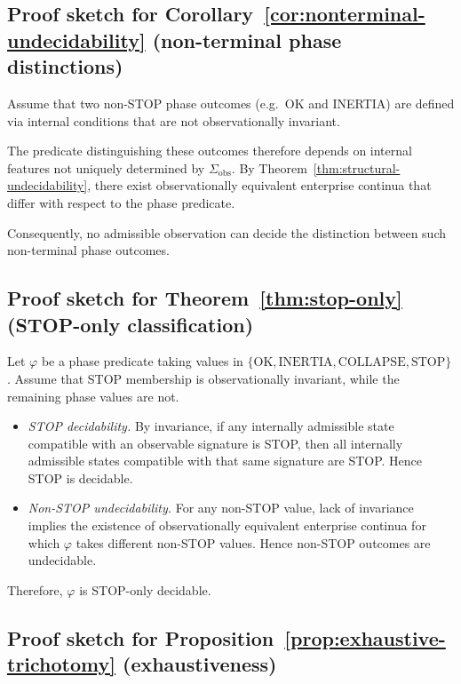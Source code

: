 \subsection{Proof sketch for Corollary~\ref{cor:nonterminal-undecidability}
(non-terminal phase distinctions)}

Assume that two non-STOP phase outcomes (e.g.\ OK and INERTIA) are
defined via internal conditions that are not observationally invariant.

The predicate distinguishing these outcomes therefore depends on
internal features not uniquely determined by
$\Sigma_{\mathrm{obs}}$. By
Theorem~\ref{thm:structural-undecidability}, there exist
observationally equivalent enterprise continua that differ with respect
to the phase predicate.

Consequently, no admissible observation can decide the distinction
between such non-terminal phase outcomes.

\subsection{Proof sketch for Theorem~\ref{thm:stop-only}
(STOP-only classification)}

Let $\varphi$ be a phase predicate taking values in
$\{\text{OK}, \text{INERTIA}, \text{COLLAPSE}, \text{STOP}\}$.
Assume that STOP membership is observationally invariant, while the
remaining phase values are not.

\begin{itemize}
\item \emph{STOP decidability.} By invariance, if any internally
      admissible state compatible with an observable signature is STOP,
      then all internally admissible states compatible with that same
      signature are STOP. Hence STOP is decidable.
\item \emph{Non-STOP undecidability.} For any non-STOP value, lack of
      invariance implies the existence of observationally equivalent
      enterprise continua for which $\varphi$ takes different non-STOP
      values. Hence non-STOP outcomes are undecidable.
\end{itemize}

Therefore, $\varphi$ is STOP-only decidable.

\subsection{Proof sketch for Proposition~\ref{prop:exhaustive-trichotomy}
(exhaustiveness)}

